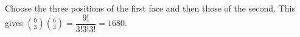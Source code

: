 Choose the three positions of the first face and then those of the second. This gives $\binom93\binom63=\dfrac{9!}{3!3!3!}=\boxed{1680}$.
